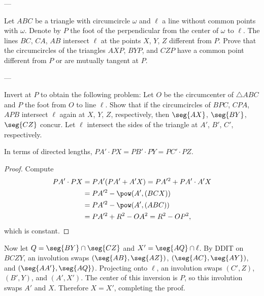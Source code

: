 
---

Let $ABC$ be a triangle with circumcircle $\omega$ and $\ell$ a line without common points with $\omega$. Denote by $P$ the foot of the perpendicular from the center of $\omega$ to $\ell$. The lines $BC$, $CA$, $AB$ intersect $\ell$ at the points $X$, $Y$, $Z$ different from $P$. Prove that the circumcircles of the triangles $AXP$, $BYP$, and $CZP$ have a common point different from $P$ or are mutually tangent at $P$.

---

Invert at $P$ to obtain the following problem: Let $O$ be the circumcenter of $\triangle ABC$ and $P$ the foot from $O$ to line $\ell$. Show that if the circumcircles of $BPC$, $CPA$, $APB$ intersect $\ell$ again at $X$, $Y$, $Z$, respectively, then $\seg{AX}$, $\seg{BY}$, $\seg{CZ}$ concur. Let $\ell$ intersect the sides of the triangle at $A'$, $B'$, $C'$, respectively.
\begin{iclaim*}
    In terms of directed lengths, $PA'\cdot PX=PB'\cdot PY=PC'\cdot PZ$.
\end{iclaim*}
\begin{proof}
    Compute
    \begin{align*}
        PA'\cdot PX&=PA'(PA'+A'X)
        =PA'^2+PA'\cdot A'X\\
        &=PA'^2-\pow(A',(BCX))\\
        &=PA'^2-\pow(A',(ABC))\\
        &=PA'^2+R^2-OA^2
        =R^2-OP^2,
    \end{align*}
    which is constant.
\end{proof}

Now let $Q=\seg{BY}\cap\seg{CZ}$ and $X'=\seg{AQ}\cap\ell$. By DDIT on $BCZY$, an involution swaps $(\seg{AB},\seg{AZ})$, $(\seg{AC},\seg{AY})$, and $(\seg{AA'},\seg{AQ})$. Projecting onto $\ell$, an involution swaps $(C',Z)$, $(B',Y)$, and $(A',X')$. The center of this inversion is $P$, so this involution swaps $A'$ and $X$. Therefore $X=X'$, completing the proof.


